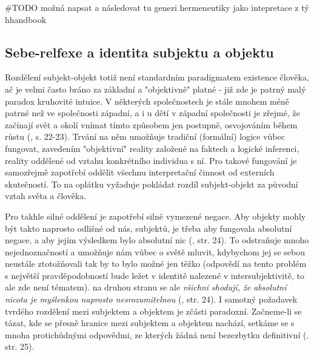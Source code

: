 \documentclass[11pt,a4paper]{article}
\begin{document}
#TODO možná napsat a následovat tu genezi hermeneutiky jako intepretace z tý hhandbook

\subsection{Sebe-relfexe a identita subjektu a objektu}

Rozdělení subjekt-objekt totiž není standardním paradigmatem existence člověka, ač je velmi často bráno za základní a "objektivně" platné - již zde je patrný malý paradox kruhovité intuice. V některých společnostech je stále mnohem méně patrné než ve společnosti západní, a i u dětí v západní společnosti je zřejmé, že začínají svět a okolí vnímat tímto způsobem jen postupně, osvojováním během růstu (\cite{kainz_paradox_1988}, s. 22-23). Trvání na něm umožňuje tradiční (formální) logice vůbec fungovat, zavedením "objektivní" reality založené na faktech a logické inferenci, reality oddělené od vztahu konkrétního individua s ní. Pro takové fungování je samozřejmě zapotřebí oddělit všechnu interpretační činnost od externích skutečností. To na oplátku vyžaduje pokládat rozdíl  subjekt-objekt za původní vztah světa a člověka. 

Pro takhle silné oddělení je zapotřebí silně vymezené negace. Aby objekty mohly být takto naprosto odlišné od nás, subjektů, je třeba aby fungovala absolutní negace, a aby jejím výsledkem bylo absolutní nic (\cite{kainz_paradox_1988}, str. 24). To odstraňuje mnoho nejednoznačností a umožňuje nám vůbec o světě mluvit, kdybychom jej se sebou neustále ztotožňovali tak by to bylo možné jen těžko (odpovědí na tento problém s největší pravděpodobností bude ležet v identitě nalezené v intersubjektivitě, to ale zde není tématem). na druhou stranu se ale \textit{všichni shodují, že absolutní nicota je myšlenkou naprosto nesrozumitelnou} (\cite{kainz_paradox_1988}, str. 24). I samotný požadavek tvrdého rozdělení mezi subjektem a objektem je zčásti paradoxní. Začneme-li se tázat, kde se přesně hranice mezi subjektem a objektem nachází, setkáme se s mnoha protichůdnými odpovědmi, ze kterých žádná není bezezbytku definitivní (\cite{kainz_paradox_1988}. str. 25). 
\end{document}
